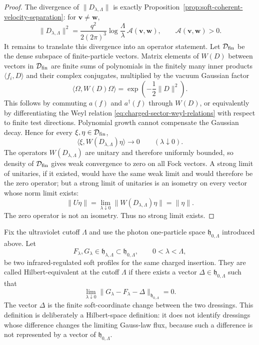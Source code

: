 \begin{proof}
The divergence of \(\|D_{\lambda,\Lambda}\|\) is exactly
Proposition~\ref{prop:soft-coherent-velocity-separation}: for
\(\mathbf v\ne\mathbf w\),
\[
  \|D_{\lambda,\Lambda}\|^2
  =
  \frac{q^2}{2(2\pi)^3}
  \log\frac{\Lambda}{\lambda}\,
  \mathcal A(\mathbf v,\mathbf w),
  \qquad
  \mathcal A(\mathbf v,\mathbf w)>0 .
\]
It remains to translate this divergence into an operator statement.  Let
\(\mathcal D_{\rm fin}\) be the dense subspace of finite-particle vectors.
Matrix elements of \(W(D)\) between vectors in
\(\mathcal D_{\rm fin}\) are finite sums of polynomials in the finitely many
inner products \(\langle f_i,D\rangle\) and their complex conjugates,
multiplied by the vacuum Gaussian factor
\[
  \langle\Omega,W(D)\Omega\rangle
  =
  \exp\!\left(-\frac12\|D\|^2\right).
\]
This follows by commuting \(a(f)\) and \(a^\dagger(f)\) through \(W(D)\), or
equivalently by differentiating the Weyl relation
\eqref{eq:charged-sector-weyl-relations} with respect to finite test
directions.  Polynomial growth cannot compensate the Gaussian decay.  Hence
for every \(\xi,\eta\in\mathcal D_{\rm fin}\),
\[
  \langle\xi,W(D_{\lambda,\Lambda})\eta\rangle
  \longrightarrow0
  \qquad(\lambda\downarrow0).
\]
The operators \(W(D_{\lambda,\Lambda})\) are unitary and therefore uniformly
bounded, so density of \(\mathcal D_{\rm fin}\) gives weak convergence to zero
on all Fock vectors.  A strong limit of unitaries, if it existed, would have
the same weak limit and would therefore be the zero operator; but a strong
limit of unitaries is an isometry on every vector whose norm limit exists:
\[
  \|U\eta\|=\lim_{\lambda\downarrow0}
  \|W(D_{\lambda,\Lambda})\eta\|=\|\eta\|.
\]
The zero operator is not an isometry.  Thus no strong limit exists.
\end{proof}

\begin{definition}
\label{def:hilbert-equivalent-soft-dressings}
Fix the ultraviolet cutoff \(\Lambda\) and use the photon one-particle space
\(\mathfrak h_{0,\Lambda}\) introduced above.  Let
\[
  F_{\lambda},G_{\lambda}\in\mathfrak h_{\lambda,\Lambda}
  \subset\mathfrak h_{0,\Lambda},
  \qquad 0<\lambda<\Lambda,
\]
be two infrared-regulated soft profiles for the same charged insertion.  They
are called Hilbert-equivalent at the cutoff \(\Lambda\) if there exists a
vector \(\Delta\in\mathfrak h_{0,\Lambda}\) such that
\begin{equation}
  \lim_{\lambda\downarrow0}
  \|G_{\lambda}-F_{\lambda}-\Delta\|_{\mathfrak h_{0,\Lambda}}
  =
  0 .
  \label{eq:soft-profile-hilbert-equivalence}
\end{equation}
The vector \(\Delta\) is the finite soft-coordinate change between the two
dressings.  This definition is deliberately a Hilbert-space definition: it
does not identify dressings whose difference changes the limiting Gauss-law
flux, because such a difference is not represented by a vector of
\(\mathfrak h_{0,\Lambda}\).
\end{definition}

